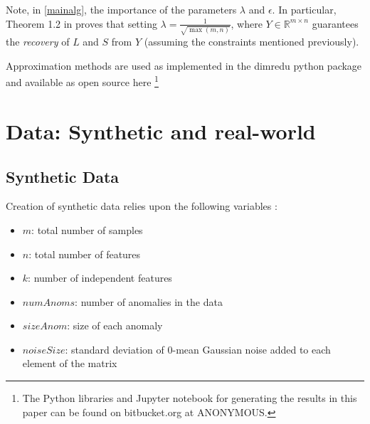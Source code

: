 \documentclass[conference]{IEEEtran}
\begin{document}
Note, in \eqref{mainalg}, the importance of the parameters $\lambda$
and $\epsilon$.  In particular, Theorem 1.2 in \cite{Candes2011}
proves that setting $\lambda = \frac{1}{\sqrt{\max(m,n)}}$, where
$Y \in \mathbb{R}^{m \times n}$ guarantees the \emph{recovery} of $L$
and $S$ from $Y$ (assuming the constraints mentioned previously).

Approximation methods are used as implemented in the dimredu python package and available as open source here
\footnote{The Python libraries and Jupyter notebook for generating the results in this paper can be found on bitbucket.org at ANONYMOUS.}

\section{Data: Synthetic and real-world}

\subsection{Synthetic Data}

Creation of synthetic data relies upon the following variables :
\begin{itemize}
\item $m$: total number of samples
\item $n$: total number of features 
\item $k$: number of independent features
\item $numAnoms$: number of anomalies in the data
\item $sizeAnom$: size of each anomaly
\item $noiseSize$: standard deviation of $0$-mean Gaussian noise added to each element of the matrix 
\end{itemize}
\end{document}
